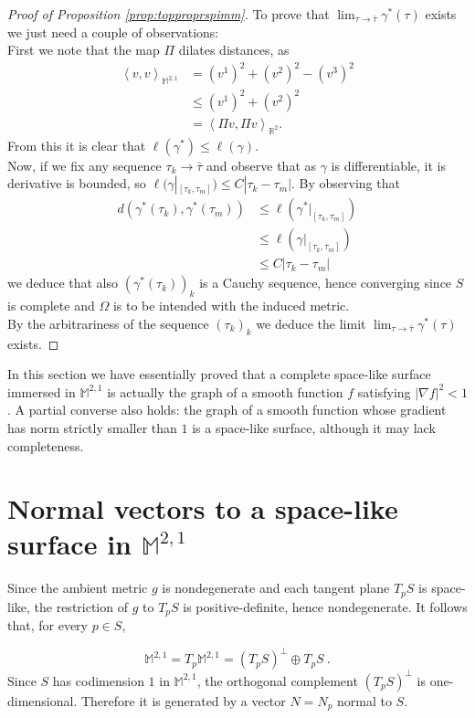 \documentclass[a4paper,11pt,openright,twoside]{book}
\renewcommand{\Omega}{\varOmega}
\newcommand{\R}{\mathbb{R}}
\newcommand{\M}{\mathbb{M}^{2,1}}
\newcommand{\1}{\mathds{1}}
\theoremstyle{plain}
\theoremstyle{definition}
\theoremstyle{remark}
\begin{document}
\begin{proof}[Proof of Proposition \ref{prop:topproprspimm}]
	To prove that $\lim_{\tau \to \bar \tau} \gamma^*(\tau) $ exists we just need a couple of observations:\\
	First we note that the map $\Pi$ dilates distances, as
			\begin{align*}
				\left<v,v \right>_{\M} &= (v^1)^2+(v^2)^2 - (v^3)^2\\
									   &\leq (v^1) ^2 + (v^2) ^2\\
									   &= \left<\Pi v, \Pi v \right>_{\R^2}.
			\end{align*}
	From this it is clear that $\ell(\gamma^*)\leq \ell(\gamma)$.\\
	Now, if we fix any sequence  $\tau_k\to \bar \tau$ and observe that as $\gamma$ is differentiable, it is derivative is bounded, so $\ell(\gamma|_{[\tau_k,\tau_m]})\leq C |\tau_k-\tau_m|$. By observing that
			\begin{align*}
				d(\gamma^*(\tau_k),\gamma^*(\tau_m)) &\leq \ell(\gamma^*|_{[\tau_k,\tau_m]})\\
													 &\leq \ell(\gamma|_{[\tau_k,\tau_m]})\\
											   &\leq C|\tau_k-\tau_m|
			\end{align*}
			we deduce that also $(\gamma^*(\tau_k))_{k}$ is a Cauchy sequence, hence converging since $S$ is complete and $\Omega$ is to be intended with the induced metric.\\
			By the arbitrariness of the sequence  $(\tau_k)_k$ we deduce the limit $\lim_{\tau\to \bar \tau} \gamma^*(\tau) $ exists.
\end{proof}
In this section we have essentially proved that a complete space-like surface immersed in $\M$ is actually the graph of a smooth function $f$ satisfying $|\nabla f|^2<1$. A partial converse also holds: the graph of a smooth function whose gradient has norm strictly smaller than $1$ is a space-like surface, although it may lack completeness.
\section{Normal vectors to a space-like surface in $\M$}%
Since the ambient metric $g$ is nondegenerate and each tangent plane $T_pS$ is space-like, the restriction of $g$ to $T_pS$ is positive-definite, hence nondegenerate. It follows that, for every $p\in S$,

\begin{equation*}
	\M = T_p \M = (T_p S)^\perp \oplus T_pS \ .
\end{equation*}
Since $S$ has codimension $1$ in $\M$, the orthogonal complement $(T_pS)^\perp$ is one-dimensional. Therefore it is generated by a vector $N = N_p$ normal to $S$.\\
\end{document}
